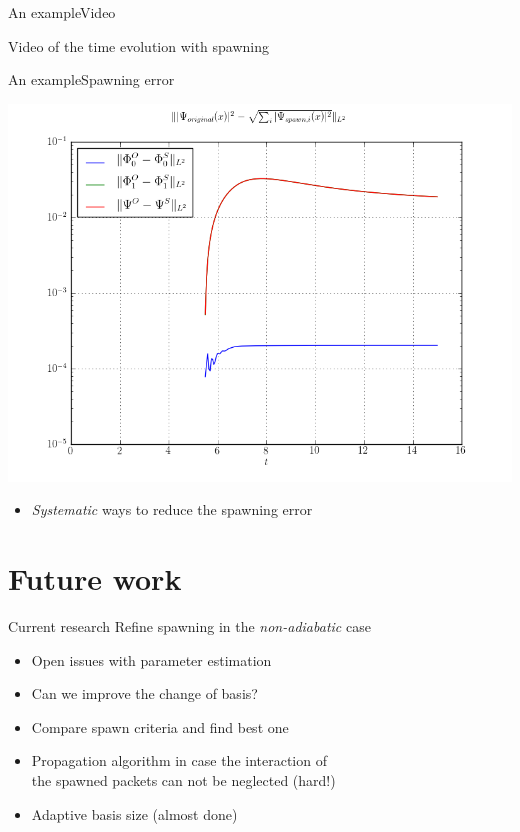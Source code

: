 \documentclass{beamer}
\begin{document}
\begin{frame}{An example}{Video}
  \begin{center}
    Video of the time evolution with spawning
  \end{center}
\end{frame}


\begin{frame}{An example}{Spawning error}
  \begin{center}
    \includegraphics[scale=0.35]{./fig/spawn_error_sum_L2norm0.png}
  \end{center}
  \begin{itemize}
    \item \emph{Systematic} ways to reduce the spawning error
  \end{itemize}
\end{frame}


\section{Future work}


\begin{frame}{Current research}
  Refine spawning in the \emph{non-adiabatic} case
  \begin{itemize}
    \item Open issues with parameter estimation
    \item Can we improve the change of basis?
    \item Compare spawn criteria and find best one
    \item Propagation algorithm in case the interaction of\\
    the spawned packets can not be neglected (hard!)
    \item Adaptive basis size (almost done)
  \end{itemize}
\end{frame}
\end{document}
